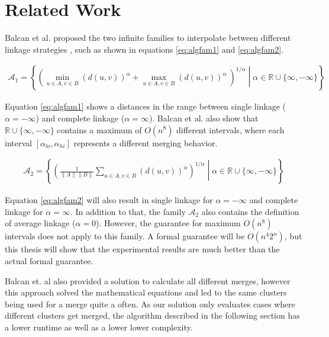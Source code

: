 \chapter{Related Work}

Balcan et al. proposed the two infinite families to interpolate between different linkage strategies \cite{DBLP:journals/corr/BalcanNVW16}, such as shown in equations \ref{eq:algfam1} and \ref{eq:algfam2}.

\begin{equation}
    \begin{aligned}
        \mathcal{A}_1 = \left\{ \left( \min\limits_{u \in A, v \in B} (d(u,v))^\alpha +  \max\limits_{u \in A, v \in B} (d(u,v))^\alpha\ \right)^{1 / \alpha} \middle| \alpha \in \mathbb{R} \cup \{\infty, -\infty\} \right\}
    \end{aligned}
    \label{eq:algfam1}
\end{equation}

Equation \ref{eq:algfam1} shows a distances in the range between single linkage ($\alpha = -\infty$) and complete linkage ($\alpha = \infty$). Balcan et al. also show that $\mathbb{R} \cup \{\infty, -\infty\}$ contains a maximum of $O(n^8)$ different intervals, where each interval $[\alpha_{lo}, \alpha_{hi}]$ represents a different merging behavior.

\begin{equation}
    \begin{aligned}
        \mathcal{A}_2 = \left\{ \left( \frac{1}{\|A\| \|B\|} \sum\limits_{u \in A, v \in B} (d(u,v))^\alpha \right)^{1 / \alpha} \middle| \alpha \in \mathbb{R} \cup \{\infty, -\infty\} \right\}
    \end{aligned}
    \label{eq:algfam2}
\end{equation}

Equation \ref{eq:algfam2} will also result in single linkage for $\alpha = - \infty$ and complete linkage for $\alpha = \infty$. In addition to that, the family $\mathcal{A}_2$ also contains the definition of average linkage ($\alpha = 0$). However, the guarantee for maximum $O(n^8)$ intervals does not apply to this family. A formal guarantee will be $O(n^4 2^n)$, but this thesis will show that the experimental results are much better than the actual formal guarantee.

Balcan et. al also provided a solution to calculate all different merges, however this approach solved the mathematical equations and led to the same clusters being used for a merge quite a often. As our solution only evaluates cases where different clusters get merged, the algorithm described in the following section has a lower runtime as well as a lower lower complexity.

